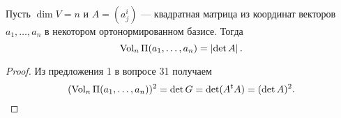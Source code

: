 \begin{corollary}
    Пусть $\dim V = n$ и $A = (a^i_j)$ --- квадратная матрица из координат векторов $a_1, \ldots, a_n$ в некотором ортонормированном базисе. Тогда
    \[
        \operatorname{Vol}_n\Pi(a_1, \ldots, a_n) = \left\lvert\det A\right\rvert.
    \]
\end{corollary}

\begin{proof}
    Из предложения 1 в вопросе 31 получаем
    \[
        (\operatorname{Vol}_n\Pi(a_1, \ldots, a_n))^2 = \det G = \det(A^tA) = (\det A)^2.
    \]
\end{proof}

